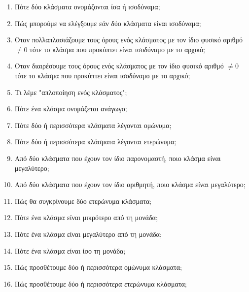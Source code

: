 \documentclass[a4paper,11pt]{report}
\begin{document}



\begin{enumerate}
\item Πότε δύο κλάσματα ονομάζονται ίσα ή ισοδύναμα;
\item Πώς μπορούμε να ελέγξουμε εάν δύο κλάσματα είναι ισοδύναμα;
\item Όταν πολλαπλασιάζουμε τους όρους ενός κλάσματος με τον ίδιο φυσικό αριθμό $\neq0$ τότε το κλάσμα που 
      προκύπτει είναι ισοδύναμο με το αρχικό;
\item Όταν διαιρέσουμε τους όρους ενός κλάσματος με τον ίδιο φυσικό αριθμό $\neq0$ τότε το κλάσμα που 
      προκύπτει είναι ισοδύναμο με το αρχικό;
\item Τι λέμε "απλοποίηση ενός κλάσματος";
\item Πότε ένα κλάσμα ονομάζεται ανάγωγο;
\item Πότε δύο ή περισσότερα κλάσματα λέγονται ομώνυμα;
\item Πότε δύο ή περισσότερα κλάσματα λέγονται ετερώνυμα;
\item Από δύο κλάσματα που έχουν τον ίδιο παρονομαστή, ποιο κλάσμα είναι μεγαλύτερο;
\item Από δύο κλάσματα που έχουν τον ίδιο αριθμητή, ποιο κλάσμα είναι μεγαλύτερο;
\item Πώς θα συγκρίνουμε δύο ετερώνυμα κλάσματα;
\item Πότε ένα κλάσμα είναι μικρότερο από τη μονάδα;
\item Πότε ένα κλάσμα είναι μεγαλύτερο από τη μονάδα;
\item Πότε ένα κλάσμα είναι ίσο τη μονάδα;
\item Πώς προσθέτουμε δύο ή περισσότερα ομώνυμα κλάσματα;
\item Πώς προσθέτουμε δύο ή περισσότερα ετερώνυμα κλάσματα;

\end{enumerate}
\end{document}
